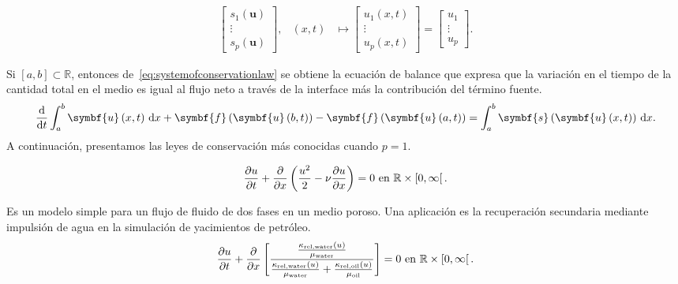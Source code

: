 \begin{definition}
\begin{align*}
\begin{bmatrix}
			s_{1}\left(\symbf{u}\right) \\
			\vdots                      \\
			s_{p}\left(\symbf{u}\right)
		\end{bmatrix},                       &
		\left(x,t\right)                                     &
		\longmapsto
		\begin{bmatrix}
			u_{1}\left(x,t\right) \\
			\vdots                \\
			u_{p}\left(x,t\right)
		\end{bmatrix}=
		\begin{bmatrix}
			u_{1}  \\
			\vdots \\
			u_{p}
		\end{bmatrix}.
	\end{align*}
\end{definition}
Si $\left[a,b\right]\subset\mathbb{R}$, entonces
de~\eqref{eq:systemofconservationlaw} se obtiene la ecuación de
balance que expresa que la variación en el tiempo de la cantidad
total en el medio es igual al flujo neto a través de la interface
más la contribución del término fuente.
\begin{equation*}
	\diff{}{t}
	\int_{a}^{b}
	\symbf{u}
	\left(x,t\right)
	\dl x+
	\symbf{f}\left(\symbf{u}\left(b,t\right)\right)-
	\symbf{f}\left(\symbf{u}\left(a,t\right)\right)=
	\int_{a}^{b}
	\symbf{s}
	\left(\symbf{u}\left(x,t\right)\right)
	\dl x.
\end{equation*}
A continuación, presentamos las leyes de conservación más conocidas
cuando $p=1$.

\begin{example}
	\begin{equation*}
		\diffp{u}{t}+
		\diffp*{\left(\frac{u^{2}}{2}-\nu\diffp{u}{x}\right)}{x}=
		0
		\text{ en }\mathbb{R}\times\left[0,\infty\right[.
	\end{equation*}
\end{example}

\begin{example}
	Es un modelo simple para un flujo de fluido de dos fases en un
	medio poroso.
	Una aplicación es la recuperación secundaria mediante impulsión de
	agua en la simulación de yacimientos de petróleo.
	\begin{equation*}
		\diffp{u}{t}+
		\diffp*{\left[\frac{\frac{\kappa_{\text{rel,water}}\left(u\right)}{\mu_{\text{water}}}}{\frac{\kappa_{\text{rel,water}}\left(u\right)}{\mu_{\text{water}}}+\frac{\kappa_{\text{rel,oil}}\left(u\right)}{\mu_{\text{oil}}}}\right]}{x}=
		0
		\text{ en }\mathbb{R}\times\left[0,\infty\right[.
	\end{equation*}
\end{example}

